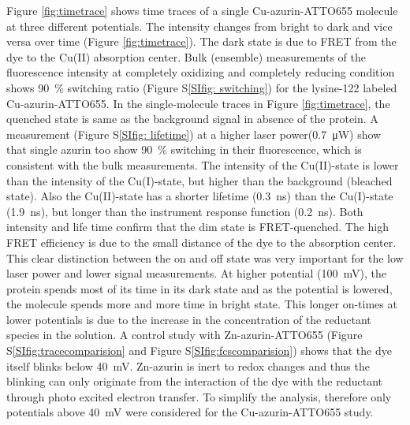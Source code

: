 \documentclass[journal=jacsat,manuscript=article]{achemso}
\begin{document}
Figure \ref{fig:timetrace} shows time traces of a single Cu-azurin-ATTO655 molecule at three different potentials. 
The intensity changes from bright to dark and vice versa over time (Figure \ref{fig:timetrace}).
The dark state is due to FRET from the dye to the Cu(II) absorption center\cite{kuznetsova2006a}.
Bulk (ensemble) measurements of the fluorescence intensity at completely oxidizing and completely reducing condition shows \SI{90}{\percent} switching ratio (Figure S\ref{SIfig: switching}) for the lysine-122 labeled Cu-azurin-ATTO655.\cite{nicolardi2012topdown}
In the single-molecule traces in Figure \ref{fig:timetrace}, the quenched state is same as the background signal in absence of the protein.
A measurement (Figure S\ref{SIfig: lifetime}) at a higher laser power(\SI{0.7}{\uW}) show that single azurin too show \SI{90}{\percent} switching in their fluorescence, which is consistent with the bulk measurements.
The intensity of the Cu(II)-state is lower than the intensity of the Cu(I)-state, but higher than the background (bleached state).
Also the Cu(II)-state has a shorter lifetime (\SI{0.3}{\ns}) than the Cu(I)-state (\SI{1.9}{\ns}), but longer than the instrument response function (\SI{0.2}{\ns}). 
Both intensity and life time confirm that the dim state is FRET-quenched.
The high FRET efficiency is due to the small distance of the dye to the absorption center.
This clear distinction between the on and off state was very important for the low laser power and lower signal measurements.
At higher potential (\SI{100}{\mV}), the protein spends most of its time in its dark state and as the potential is lowered, the molecule spends more and more time in bright state.
This longer on-times at lower potentials is due to the increase in the concentration of the reductant species in the solution.
A control study with Zn-azurin-ATTO655 (Figure S\ref{SIfig:tracecomparision} and Figure S\ref{SIfig:fcscomparision}) shows that the dye itself blinks below \SI{40}{\mV}.
Zn-azurin is inert to redox changes and thus the blinking can only originate from the interaction of the dye with the reductant through photo excited electron transfer.
To simplify the analysis, therefore only potentials above \SI{40}{\mV} were considered for the Cu-azurin-ATTO655 study.\\

\end{document}
